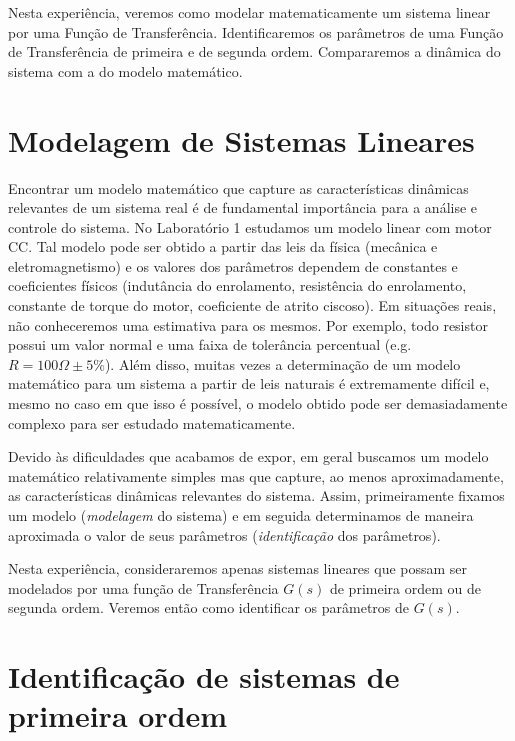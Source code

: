 \documentclass[
]{book}
\theoremstyle{definition}
\theoremstyle{definition}
\theoremstyle{definition}
\theoremstyle{remark}
\begin{document}
Nesta experiência, veremos como modelar matematicamente um sistema linear por uma Função de Transferência. Identificaremos os parâmetros de uma Função de Transferência de primeira e de segunda ordem. Compararemos a dinâmica do sistema com a do modelo matemático.

\hypertarget{modelagem-de-sistemas-lineares}{%
\section{Modelagem de Sistemas Lineares}\label{modelagem-de-sistemas-lineares}}

Encontrar um modelo matemático que capture as características dinâmicas relevantes de um sistema real é de fundamental importância para a análise e controle do sistema. No Laboratório 1 estudamos um modelo linear com motor CC. Tal modelo pode ser obtido a partir das leis da física (mecânica e eletromagnetismo) e os valores dos parâmetros dependem de constantes e coeficientes físicos (indutância do enrolamento, resistência do enrolamento, constante de torque do motor, coeficiente de atrito ciscoso). Em situações reais, não conheceremos uma estimativa para os mesmos. Por exemplo, todo resistor possui um valor normal e uma faixa de tolerância percentual (e.g.~\(R = 100 \Omega \pm 5\%\)). Além disso, muitas vezes a determinação de um modelo matemático para um sistema a partir de leis naturais é extremamente difícil e, mesmo no caso em que isso é possível, o modelo obtido pode ser demasiadamente complexo para ser estudado matematicamente.

Devido às dificuldades que acabamos de expor, em geral buscamos um modelo matemático relativamente simples mas que capture, ao menos aproximadamente, as características dinâmicas relevantes do sistema. Assim, primeiramente fixamos um modelo (\emph{modelagem} do sistema) e em seguida determinamos de maneira aproximada o valor de seus parâmetros (\emph{identificação} dos parâmetros).

Nesta experiência, consideraremos apenas sistemas lineares que possam ser modelados por uma função de Transferência \(G(s)\) de primeira ordem ou de segunda ordem. Veremos então como identificar os parâmetros de \(G(s)\).

\hypertarget{identificauxe7uxe3o-de-sistemas-de-primeira-ordem}{%
\section{Identificação de sistemas de primeira ordem}\label{identificauxe7uxe3o-de-sistemas-de-primeira-ordem}}
\end{document}
